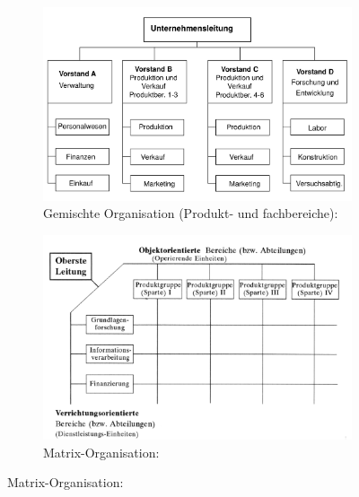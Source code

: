 \documentclass[11pt,a4paper]{article}
\begin{document}
\begin{figure}[H]
\begin{subfigure}{0.45\textwidth}
	\end{subfigure}
	~
	\begin{subfigure}{0.45\textwidth}
		\caption*{Gemischte Organisation (Produkt- und fachbereiche):}
		\includegraphics[width=\textwidth]{gemischte}
	\end{subfigure}
	
	\begin{subfigure}{0.5\textwidth}
		\caption*{Matrix-Organisation:}
		\includegraphics[width=\textwidth]{matrixorganisation}
	\end{subfigure}
\end{figure}
\end{document}
